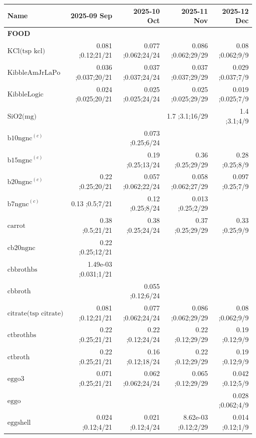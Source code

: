 \newcommand{\mjmdateminln}{2025-09-01}
\newcommand{\mjmdatemaxln}{2025-12-09}
\newcommand{\mjmsuperscriptsln}{{\bf a) } SMVT substrate. Biotin, Pantothenate, Lipoic Acid, and Iodine known to compete..{\bf c) } hamburger with varying fat percentages- 7,10,15,20, etc. ..}
\begin{table}[H]
\centering
\begin{tabular}{|l|r|r|r|r|}
\hline
Name&2025-09 Sep&2025-10 Oct&2025-11 Nov&2025-12 Dec\\
\hline
{\bf FOOD}&&&&\\
$\textrm{KCl(tsp~kcl)}$&0.081 ;0.12;21/21&0.077 ;0.062;24/24&0.086 ;0.062;29/29&0.08 ;0.062;9/9\\
$\textrm{KibbleAmJrLaPo}$&0.036 ;0.037;20/21&0.037 ;0.037;24/24&0.037 ;0.037;29/29&0.029 ;0.037;7/9\\
$\textrm{KibbleLogic}$&0.024 ;0.025;20/21&0.025 ;0.025;24/24&0.025 ;0.025;29/29&0.019 ;0.025;7/9\\
$\textrm{SiO2(mg)}$&&&1.7 ;3.1;16/29&1.4 ;3.1;4/9\\
$\textrm{b10ngnc}^{\left(c\right)}$&&0.073 ;0.25;6/24&&\\
$\textrm{b15ngnc}^{\left(c\right)}$&&0.19 ;0.25;13/24&0.36 ;0.25;29/29&0.28 ;0.25;8/9\\
$\textrm{b20ngnc}^{\left(c\right)}$&0.22 ;0.25;20/21&0.057 ;0.062;22/24&0.058 ;0.062;27/29&0.097 ;0.25;7/9\\
$\textrm{b7ngnc}^{\left(c\right)}$&0.13 ;0.5;7/21&0.12 ;0.25;8/24&0.013 ;0.25;2/29&\\
$\textrm{carrot}$&0.38 ;0.5;21/21&0.38 ;0.25;24/24&0.37 ;0.25;29/29&0.33 ;0.25;9/9\\
$\textrm{cb20ngnc}$&0.22 ;0.25;12/21&&&\\
$\textrm{cbbrothbs}$&1.49e-03 ;0.031;1/21&&&\\
$\textrm{cbbroth}$&&0.055 ;0.12;6/24&&\\
$\textrm{citrate(tsp~citrate)}$&0.081 ;0.12;21/21&0.077 ;0.062;24/24&0.086 ;0.062;29/29&0.08 ;0.062;9/9\\
$\textrm{ctbrothbs}$&0.22 ;0.25;21/21&0.22 ;0.12;24/24&0.22 ;0.12;29/29&0.19 ;0.12;9/9\\
$\textrm{ctbroth}$&0.22 ;0.25;21/21&0.16 ;0.12;18/24&0.22 ;0.12;29/29&0.19 ;0.12;9/9\\
$\textrm{eggo3}$&0.071 ;0.25;21/21&0.062 ;0.062;24/24&0.065 ;0.12;29/29&0.042 ;0.12;5/9\\
$\textrm{eggo}$&&&&0.028 ;0.062;4/9\\
$\textrm{eggshell}$&0.024 ;0.12;4/21&0.021 ;0.12;4/24&8.62e-03 ;0.12;2/29&0.014 ;0.12;1/9\\

\end{tabular}
\end{table}
